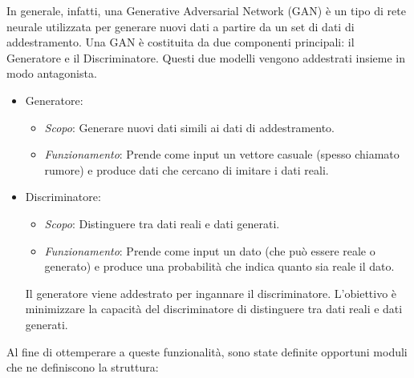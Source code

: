 \documentclass[12pt,a4paper,openright,twoside]{book}
\begin{document}
In generale, infatti, una Generative Adversarial Network (GAN) è un tipo di rete neurale utilizzata per generare nuovi dati a partire da un set di dati di addestramento. Una GAN è costituita da due componenti principali: il Generatore e il Discriminatore. Questi due modelli vengono addestrati insieme in modo antagonista.
\begin{itemize}
\item Generatore:
\begin{itemize}
\item {\itshape Scopo}: Generare nuovi dati simili ai dati di addestramento.
\item {\itshape Funzionamento}: Prende come input un vettore casuale (spesso chiamato rumore) e produce dati che cercano di imitare i dati reali.
\end{itemize}
\item Discriminatore:
\begin{itemize}
\item {\itshape Scopo}: Distinguere tra dati reali e dati generati.
\item {\itshape Funzionamento}: Prende come input un dato (che può essere reale o generato) e produce una probabilità che indica quanto sia reale il dato.
\end{itemize}
Il generatore viene addestrato per ingannare il discriminatore. L'obiettivo è minimizzare la capacità del discriminatore di distinguere tra dati reali e dati generati.\\
\end{itemize}
Al fine di ottemperare a queste funzionalità, sono state definite opportuni moduli che ne definiscono la struttura:
\end{document}

